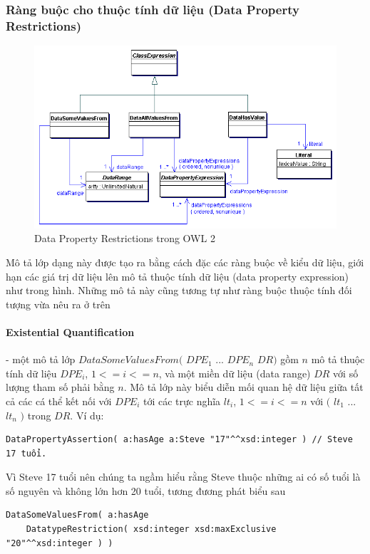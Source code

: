\subsubsection{Ràng buộc cho thuộc tính dữ liệu (Data Property Restrictions)}
\begin{figure}[h]
	\centering
	\includegraphics[width=120mm]{Figures/ce_3.png}
	\caption{Data Property Restrictions trong OWL 2\label{overflow}}
\end{figure}
Mô tả lớp dạng này được tạo ra bằng cách đặc các ràng buộc về kiểu dữ liệu, giới hạn các giá trị dữ liệu lên mô tả thuộc tính dữ liệu (data property expression) như trong hình. Những mô tả này cũng tương tự như ràng buộc thuộc tính đối tượng vừa nêu ra ở trên

\paragraph{Existential Quantification} - một mô tả lớp $DataSomeValuesFrom($ $DPE_{1}$ ... $DPE_{n}$ $DR)$ gồm $n$ mô tả thuộc tính dữ liệu $DPE_{i}$, $1<=i<=n$, và một miền dữ liệu (data range) $DR$ với số lượng tham số phải bằng $n$. Mô tả lớp này biểu diễn mối quan hệ dữ liệu giữa tất cả các cá thể kết nối với $DPE_{i}$ tới các trực nghĩa $lt_{i}$, $1<=i<=n$ với $($ $lt_{1}$ ... $lt_{n}$ $)$ trong $DR$. Ví dụ:
\begin{verbatim}
DataPropertyAssertion( a:hasAge a:Steve "17"^^xsd:integer ) // Steve 17 tuổi.
\end{verbatim}
Vì Steve 17 tuổi nên chúng ta ngầm hiểu rằng Steve thuộc những ai có số tuổi là số nguyên và không lớn hơn 20 tuổi, tương đương phát biểu sau
\begin{verbatim}
DataSomeValuesFrom( a:hasAge 
    DatatypeRestriction( xsd:integer xsd:maxExclusive "20"^^xsd:integer ) )
\end{verbatim}

